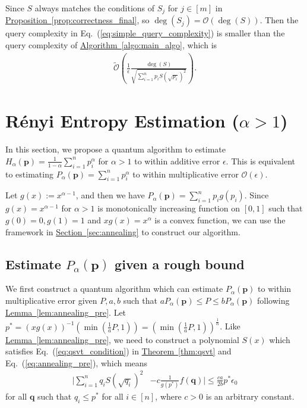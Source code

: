 \documentclass[journal]{IEEEtran}
\newcommand{\eq}[1]{Eq.~(\ref{eq:#1})}
\newcommand{\thm}[1]{\hyperref[thm:#1]{Theorem~\ref*{thm:#1}}}
\newcommand{\lem}[1]{\hyperref[lem:#1]{Lemma~\ref*{lem:#1}}}
\newcommand{\prop}[1]{\hyperref[prop:#1]{Proposition~\ref*{prop:#1}}}
\newcommand{\algo}[1]{\hyperref[algo:#1]{Algorithm~\ref*{algo:#1}}}
\renewcommand{\sec}[1]{\hyperref[sec:#1]{Section~\ref*{sec:#1}}}
\begin{document}
Since $S$ always matches the conditions of $S_j$ for $j\in[m]$ in \prop{correctness_final}, so $\deg(S_j) = \mathcal{O}(\deg(S))$. Then the query complexity in \eq{simple_query_complexity} is smaller than the query complexity of \algo{main_algo}, which is
\begin{align}
    \widetilde{\mathcal{O}}\left(\frac{1}{\epsilon}\frac{\deg(S)}{\sqrt{\sum_{i=1}^n p_i S(\sqrt{p_i})^2}}\right).
\end{align}
\fi




\section{R{\'e}nyi Entropy Estimation ($\alpha>1$)}\label{sec:alpha-large}
\noindent
In this section, we propose a quantum algorithm to estimate $H_{\alpha}(\mathbf{p}) = \frac{1}{1-\alpha}\sum_{i=1}^np_i^{\alpha}$ for $\alpha > 1$ to within additive error $\epsilon$. This is equivalent to estimating $P_{\alpha}(\mathbf{p}) = \sum_{i=1}^n p_i^{\alpha}$ to within multiplicative error $\mathcal{O}(\epsilon)$.

Let $g(x) := x^{\alpha-1}$, and then we have $P_{\alpha}(\mathbf{p}) = \sum_{i=1}^n p_i g(p_i)$. Since $g(x) = x^{\alpha-1}$ for $\alpha > 1 $ is monotonically increasing function on $[0,1]$ such that $g(0)= 0, g(1) = 1$ and $xg(x) = x^{\alpha}$ is a convex function, we can use the framework in \sec{annealing} to construct our algorithm.

\subsection{Estimate $P_{\alpha}(\mathbf{p})$ given a rough bound}
\noindent
We first construct a quantum algorithm which can estimate $P_{\alpha}(\mathbf{p})$ to within multiplicative error given $P,a,b$ such that $a P_{\alpha}(\mathbf{p}) \le P \le b P_{\alpha}(\mathbf{p})$ following \lem{annealing_pre}. Let $p^* = (xg(x))^{-1}(\min(\frac{1}{a}P,1)) = (\min(\frac{1}{a}P,1))^{\frac{1}{\alpha}}$. Like \lem{annealing_pre}, we need to construct a polynomial $S(x)$ which satisfies \eq{qsvt_condition} in \thm{qsvt} and \eq{annealing_pre}, which means
\begin{align}
  \Big|\sum_{i=1}^n q_i S(\sqrt{q_i})^2 &- c\frac{1}{g(p^*)}f(\mathbf{q})\Big| \le \frac{ca}{2b} p^{*}\epsilon_0
\end{align}
for all $\mathbf{q}$ such that $q_i\le p^*$ for all $i\in[n]$, where $c> 0$ is an arbitrary constant.
\end{document}
